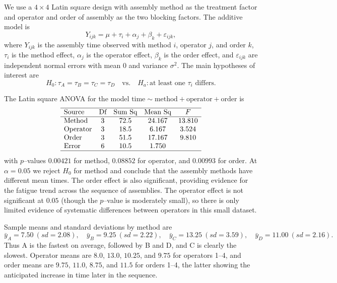 \documentclass[answers,12pt,addpoints]{exam}
\begin{document}
\begin{questions}
\begin{solution}
We use a $4\times4$ Latin square design with assembly method as the treatment
factor and operator and order of assembly as the two blocking factors. The additive
model is
\[
Y_{ijk} = \mu + \tau_i + \alpha_j + \beta_k + \varepsilon_{ijk},
\]
where $Y_{ijk}$ is the assembly time observed with method $i$, operator $j$, and
order $k$, $\tau_i$ is the method effect, $\alpha_j$ is the operator effect,
$\beta_k$ is the order effect, and $\varepsilon_{ijk}$ are independent normal
errors with mean $0$ and variance $\sigma^2$. The main hypotheses of interest are
\[
H_0:\tau_A = \tau_B = \tau_C = \tau_D
\quad\text{vs.}\quad
H_a:\text{at least one }\tau_i\text{ differs}.
\]

The Latin square ANOVA for the model
\(\text{time} \sim \text{method} + \text{operator} + \text{order}\) is
\[
\begin{array}{lcccc}
\hline
\text{Source} & \text{Df} & \text{Sum Sq} & \text{Mean Sq} & F \\
\hline
\text{Method}   & 3 & 72.5 & 24.167 & 13.810 \\
\text{Operator} & 3 & 18.5 &  6.167 &  3.524 \\
\text{Order}    & 3 & 51.5 & 17.167 &  9.810 \\
\text{Error}    & 6 & 10.5 &  1.750 &       \\
\hline
\end{array}
\]
with $p$–values $0.00421$ for method, $0.08852$ for operator, and $0.00993$ for
order. At $\alpha = 0.05$ we reject $H_0$ for method and conclude that the assembly
methods have different mean times. The order effect is also significant, providing
evidence for the fatigue trend across the sequence of assemblies. The operator
effect is not significant at $0.05$ (though the $p$–value is moderately small),
so there is only limited evidence of systematic differences between operators in
this small dataset.

Sample means and standard deviations by method are
\[
\bar{y}_A = 7.50\ (sd = 2.08),\quad
\bar{y}_B = 9.25\ (sd = 2.22),\quad
\bar{y}_C = 13.25\ (sd = 3.59),\quad
\bar{y}_D = 11.00\ (sd = 2.16).
\]
Thus A is the fastest on average, followed by B and D, and C is clearly the
slowest. Operator means are $8.0$, $13.0$, $10.25$, and $9.75$ for operators 1–4,
and order means are $9.75$, $11.0$, $8.75$, and $11.5$ for orders 1–4, the latter
showing the anticipated increase in time later in the sequence.


\end{solution}
\end{questions}
\end{document}
